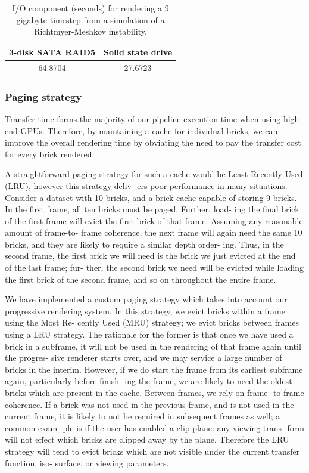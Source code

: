 \begin{table}
	\begin{center}
	\begin{tabular}{|c|c|}\hline
	\textbf{3-disk SATA RAID5} & \textbf{Solid state drive}\\\hline
	64.8704 & 27.6723\\\hline
	\end{tabular}
	\end{center}

  \caption{I/O component (seconds) for rendering a 9 gigabyte timestep
  from a simulation of a Richtmyer-Meshkov instability.}
	\label{tbl:ssd}
\end{table}

\subsubsection{Paging strategy}

Transfer time forms the majority of our pipeline execution
time when using high end GPUs. Therefore, by maintaining
a cache for individual bricks, we can improve the overall
rendering time by obviating the need to pay the transfer cost
for every brick rendered.

A straightforward paging strategy for such a cache would
be Least Recently Used (LRU), however this strategy deliv-
ers poor performance in many situations. Consider a dataset
with 10 bricks, and a brick cache capable of storing 9 bricks.
In the first frame, all ten bricks must be paged. Further, load-
ing the final brick of the first frame will evict the first brick
of that frame. Assuming any reasonable amount of frame-to-
frame coherence, the next frame will again need the same 10
bricks, and they are likely to require a similar depth order-
ing. Thus, in the second frame, the first brick we will need
is the brick we just evicted at the end of the last frame; fur-
ther, the second brick we need will be evicted while loading
the first brick of the second frame, and so on throughout the
entire frame.

We have implemented a custom paging strategy which
takes into account our progressive rendering system. In this
strategy, we evict bricks within a frame using the Most Re-
cently Used (MRU) strategy; we evict bricks between frames
using a LRU strategy. The rationale for the former is that
once we have used a brick in a subframe, it will not be
used in the rendering of that frame again until the progres-
sive renderer starts over, and we may service a large number
of bricks in the interim. However, if we do start the frame
from its earliest subframe again, particularly before finish-
ing the frame, we are likely to need the oldest bricks which
are present in the cache. Between frames, we rely on frame-
to-frame coherence. If a brick was not used in the previous
frame, and is not used in the current frame, it is likely to not
be required in subsequent frames as well; a common exam-
ple is if the user has enabled a clip plane: any viewing trans-
form will not effect which bricks are clipped away by the
plane. Therefore the LRU strategy will tend to evict bricks
which are not visible under the current transfer function, iso-
surface, or viewing parameters.


